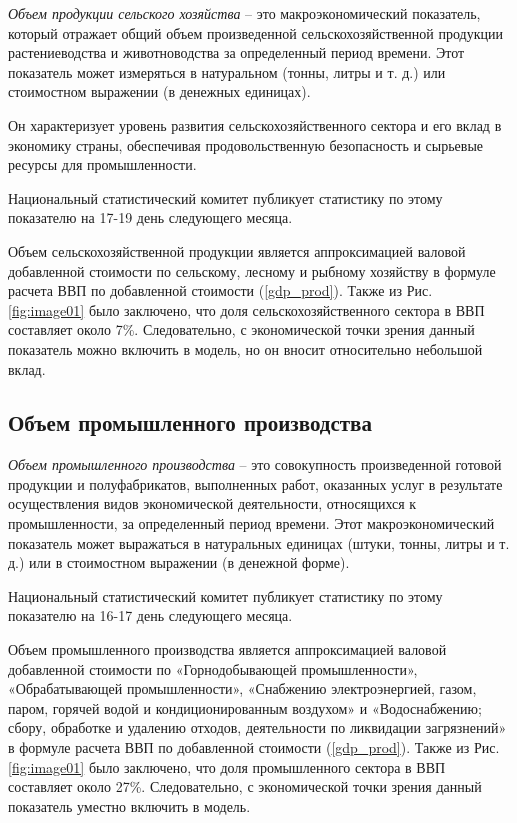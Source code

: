 \documentclass[a4paper, 14pt]{extreport}
\numberwithin{equation}{section}
\numberwithin{equation}{section}
\begin{document}
	\textit{Объем продукции сельского хозяйства} -- это макроэкономический показатель, который отражает общий объем произведенной сельскохозяйственной продукции растениеводства и животноводства за определенный период времени. Этот показатель может измеряться в натуральном (тонны, литры и т. д.) или стоимостном выражении (в денежных единицах).
	
	Он характеризует уровень развития сельскохозяйственного сектора и его вклад в экономику страны, обеспечивая продовольственную безопасность и сырьевые ресурсы для промышленности.
	
	Национальный статистический комитет публикует статистику по этому показателю на 17-19 день следующего месяца.
	
	Объем сельскохозяйственной продукции является аппроксимацией валовой добавленной стоимости по сельскому, лесному и рыбному хозяйству в формуле расчета ВВП по добавленной стоимости (\ref{gdp_prod}). Также из Рис. \ref{fig:image01} было заключено, что доля сельскохозяйственного сектора в ВВП составляет около 7\%. Следовательно, с экономической точки зрения данный показатель можно включить в модель, но он вносит относительно небольшой вклад.
	
	\subsection{Объем промышленного производства}
	
	\textit{Объем промышленного производства} -- это совокупность произведенной готовой продукции и полуфабрикатов, выполненных работ, оказанных услуг в результате осуществления видов экономической деятельности, относящихся к промышленности, за определенный период времени. Этот макроэкономический показатель может выражаться в натуральных единицах (штуки, тонны, литры и т. д.) или в стоимостном выражении (в денежной форме).
	
	Национальный статистический комитет публикует статистику по этому показателю на 16-17 день следующего месяца.
	
	Объем промышленного производства является аппроксимацией валовой добавленной стоимости по «Горнодобывающей промышленности», «Обрабатывающей промышленности», «Снабжению электроэнергией, газом, паром, горячей водой и кондиционированным воздухом» и «Водоснабжению; сбору, обработке и удалению отходов, деятельности по ликвидации загрязнений»  в формуле расчета ВВП по добавленной стоимости (\ref{gdp_prod}). Также из Рис. \ref{fig:image01} было заключено, что доля промышленного сектора в ВВП составляет около 27\%. Следовательно, с экономической точки зрения данный показатель уместно включить в модель.
	
\end{document}
